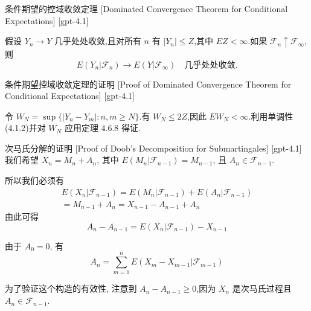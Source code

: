 \documentclass[UTF8]{ctexart}
\begin{document}
    
    
    \begin{thm}
        {条件期望的控域收敛定理}
        [Dominated Convergence Theorem for Conditional Expectations]
        [gpt-4.1]
        
假设 $Y_{n} \to Y$ 几乎处处收敛,且对所有 $n$ 有 $|Y_{n}| \leq Z$,其中 $E Z < \infty$.如果 ${\mathcal{F}}_{n} \uparrow {\mathcal{F}}_{\infty}$,则
\[
E(Y_{n}|{\mathcal{F}}_{n}) \to E(Y|{\mathcal{F}}_{\infty}) \quad \text{几乎处处收敛}.
\]

    \end{thm}
    
    
    
    \begin{prf}
        {条件期望控域收敛定理的证明}
        [Proof of Dominated Convergence Theorem for Conditional Expectations]
        [gpt-4.1]
        
令 $W_{N} = \operatorname{sup}\{ |Y_{n} - Y_{m}| : n, m \geq N \}$.有 $W_{N} \le 2Z$,因此 $E W_{N} < \infty$.利用单调性(4.1.2)并对 $W_{N}$ 应用定理 4.6.8 得证.

    \end{prf}
    
    
    
    \begin{prf}
        {次马氏分解的证明}
        [Proof of Doob's Decomposition for Submartingales]
        [gpt-4.1]
        我们希望 $X_n = M_n + A_n$, 其中 $E(M_n | \mathcal{F}_{n-1}) = M_{n-1}$, 且 $A_n \in \mathcal{F}_{n-1}$.

所以我们必须有
\[
\begin{array}{r}
E(X_n | \mathcal{F}_{n-1}) = E(M_n | \mathcal{F}_{n-1}) + E(A_n | \mathcal{F}_{n-1}) \\
= M_{n-1} + A_n = X_{n-1} - A_{n-1} + A_n
\end{array}
\]
由此可得
\[
A_n - A_{n-1} = E(X_n | \mathcal{F}_{n-1}) - X_{n-1}
\]

由于 $A_0 = 0$, 有
\[
A_n = \sum_{m=1}^n E(X_m - X_{m-1} | \mathcal{F}_{m-1})
\]

为了验证这个构造的有效性, 注意到 $A_n - A_{n-1} \geq 0$,因为 $X_n$ 是次马氏过程且 $A_n \in \mathcal{F}_{n-1}$.

    \end{prf}
    
    
    
\end{document}
